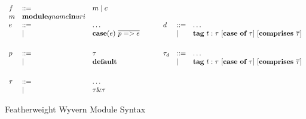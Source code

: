 \begin{figure}
\centering
\[
\begin{array}{lll}

f   & \bnfdef & m \bnfalt c \\%



m   & \keyw{module} qname \keyw{in} uri \\

e    & \bnfdef & \ldots \\
     & \bnfalt & \keyw{case}(e)~ \overline{p => e} \\
\\[1ex]

p    & \bnfdef & \tau \\
     & \bnfalt & \keyw{default} \\
\\[1ex]

\tau & \bnfdef & \ldots\\
     & \bnfalt & \tau \& \tau\\		%
	 
\end{array}
\begin{array}{lll}
~~~~
\end{array}
\begin{array}{lll}
	 
d    & \bnfdef & \ldots\\
     & \bnfalt & \keyw{tag}~ t:\tau ~ [\keyw{case}~\keyw{of}~\tau] ~ [\keyw{comprises}~ \overline{\tau}] \\
\\[1ex]

\tau_d & \bnfdef & \ldots \\
       & \bnfalt & \keyw{tag}~ t:\tau ~ [\keyw{case}~\keyw{of}~\tau] ~ [\keyw{comprises}~ \overline{\tau}] \\
\\[1ex]

\end{array}
\]
\caption{Featherweight Wyvern Module Syntax}
\label{fig:module-syntax}
\end{figure}





